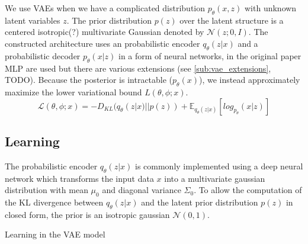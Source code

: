 We use VAEs when we have a complicated distribution $p_\theta(x,z)$ with unknown latent variables $z$.
The prior distribution $p(z)$ over the latent structure is a centered isotropic(?) multivariate Gaussian denoted by $\mathcal{N}(z;0, I)$.
The constructed architecture uses an probabilistic encoder $q_\theta(z|x)$ and a probabilistic decoder $p_\theta(x|z)$ in a form of neural networks, in the original paper MLP are used\cite{vae:2014} but there are various extensions (see \ref{sub:vae_extensions}, TODO).
Because the posterior is intractable ($p_\theta(x)$), we instead approximately maximize the lower variational bound $L(\theta,\phi;x)$.\\
\begin{equation}
  \mathcal{L}(\theta,\phi;x) = -D_{KL}(q_\theta(z|x)||p(z)) + \mathbb{E}_{q_\theta(z|x)}[log_{p_\theta}(x|z)]
\end{equation}




\newpage

\subsection{Learning}
\label{sub:vae_learning}
The probabilistic encoder $q_\theta(z|x)$ is commonly implemented using a deep neural network which transforms the input data $x$ into a multivariate gaussian distribution with mean $\mu_0$ and diagonal variance $\Sigma_0$.
To allow the computation of the KL divergence between $q_\theta(z|x)$ and the latent prior distribution $p(z)$ in closed form, the prior is an isotropic gaussian $\mathcal{N}(0, 1)$.


\begin{algorithm}
  \caption{Learning in the VAE model}
  \label{alg:vae}
  \begin{algorithmic}[1]
    \EndFor
  \end{algorithmic}
\end{algorithm}


